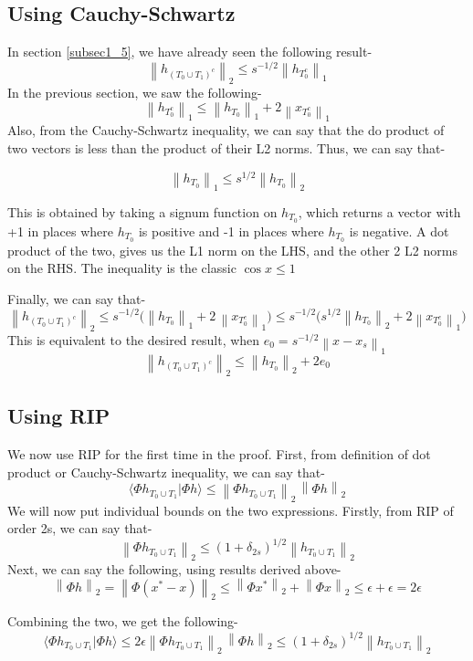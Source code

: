 \documentclass[a4paper,11pt]{article}
\numberwithin{definition}{section}
\numberwithin{mytheorem}{subsection}
\newcommand\norm[1]{\left\lVert#1\right\rVert}
\begin{document}
\subsection{Using Cauchy-Schwartz}

In section \ref{subsec1_5}, we have already seen the following result-
$$\norm{h_{(T_0 \cup T_1)^c}}_2 \leq s^{-1/2} \norm{h_{T_0^c}}_1$$
In the previous section, we saw the following-
$$ \norm{h_{T_0^c}}_1 \leq \norm{h_{T_0}}_1 + 2\norm{x_{T_0^c}}_1$$
Also, from the Cauchy-Schwartz inequality, we can say that the do product of two vectors is less than the product of their L2 norms. Thus, we can say that-

$$\norm{h_{T_0}}_1 \leq s^{1/2}\norm{h_{T_0}}_2$$

This is obtained by taking a signum function on $h_{T_0}$, which returns a vector with +1 in places where $h_{T_0}$ is positive and -1 in places where $h_{T_0}$ is negative. A dot product of the two, gives us the L1 norm on the LHS, and the other 2 L2 norms on the RHS. The inequality is the classic $\cos{x} \leq 1$

Finally, we can say that-
$$\norm{h_{(T_0 \cup T_1)^c}}_2 \leq s^{-1/2} \bigg(\norm{h_{T_0}}_1 + 2\,\norm{x_{T_0^c}}_1\bigg) \leq s^{-1/2} \bigg(s^{1/2} \norm{h_{T_0}}_2 + 2\norm{x_{T_0^c}}_1\bigg)$$
This is equivalent to the desired result, when $e_0 = s^{-1/2}\norm{x - x_s}_1$
$$\norm{h_{(T_0 \cup T_1)^c}}_2 \leq \norm{h_{T_0}}_2 + 2e_0$$

\subsection{Using RIP}
We now use RIP for the first time in the proof. First, from definition of dot product or Cauchy-Schwartz inequality, we can say that-
$$\langle \Phi h_{T_0 \cup T_1}| \Phi h\rangle \leq \norm{\Phi h_{T_0 \cup T_1}}_2 \, \norm{\Phi h}_2$$
We will now put individual bounds on the two expressions.
Firstly, from RIP of order 2s, we can say that-
$$\norm{\Phi h_{T_0 \cup T_1}}_2 \leq (1 + \delta_{2s})^{1/2} \norm{ h_{T_0 \cup T_1}}_2$$
Next, we can say the following, using results derived above-
$$\norm{\Phi h}_2 = \norm{\Phi (x^* - x)}_2 \leq \norm{\Phi x^*}_2 + \norm{\Phi x}_2 \leq \epsilon + \epsilon = 2\epsilon$$

Combining the two, we get the following-
$$\langle \Phi h_{T_0 \cup T_1}| \Phi h\rangle \leq 2\epsilon\norm{\Phi h_{T_0 \cup T_1}}_2 \, \norm{\Phi h}_2 \leq (1 + \delta_{2s})^{1/2} \norm{ h_{T_0 \cup T_1}}_2 $$
\end{document}
